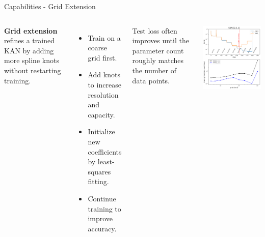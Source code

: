 \documentclass[aspectratio=169]{beamer}
\begin{document}

\begin{frame}{Capabilities - Grid Extension}
	\begin{columns}[T,onlytextwidth]
		
		\textbf{Grid extension} refines a trained KAN by adding more spline knots without restarting training.
		
		\begin{itemize}
			\item Train on a coarse grid first.
			\item Add knots to increase resolution and capacity.
			\item Initialize new coefficients by least-squares fitting.
			\item Continue training to improve accuracy.
		\end{itemize}
		
		Test loss often improves until the parameter count roughly matches the number of data points.
		
		\centering
		\includegraphics[height=0.8\textheight]{../images/grid_extension.png}
		
	\end{columns}
\end{frame}
\end{document}
